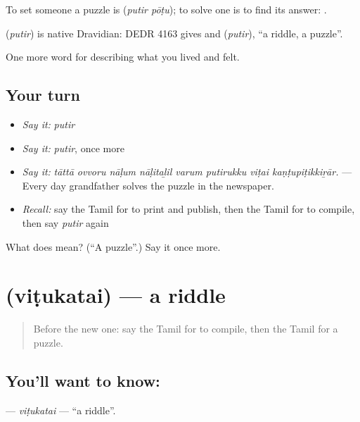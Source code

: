 To set someone a puzzle is   (\emph{putir pōṭu}); to solve one is to find its answer:   .

\begin{cousinweb}
\textbf{} (\emph{putir}) is native Dravidian: DEDR 4163 gives  and  (\emph{putir}), \textquotedblleft{}a riddle, a puzzle\textquotedblright{}.
\end{cousinweb}

\begin{grammarlens}[title={What you've built}]
One more word for describing what you lived and felt.
\end{grammarlens}

\subsection*{Your turn}
\begin{itemize}
\raggedright
  \item \emph{Say it:} \emph{putir}
  \item \emph{Say it:} \emph{putir}, once more
  \item \emph{Say it:} \emph{tāttā ovvoru nāḷum nāḷitaḻil varum putirukku viṭai kaṇṭupiṭikkiṟār.} — Every day grandfather solves the puzzle in the newspaper.
  \item \emph{Recall:} say the Tamil for to print and publish, then the Tamil for to compile, then say \emph{putir} again
\end{itemize}

\begin{tcolorbox}[breakable,colback=teal!4,colframe=teal!35!black,title={Before you move on}]
What does  mean? (\textquotedblleft{}A puzzle\textquotedblright{}.) Say it once more.
\end{tcolorbox}
\section[\texorpdfstring{\ta{விடுகதை} (viṭukatai)}{விடுகதை (viṭukatai)}]{ (viṭukatai) — a riddle}

\label{lesson:TA-C529-vitukatai}



\begin{quote}
Before the new one: say the Tamil for to compile, then the Tamil for a puzzle.
\end{quote}

\subsection*{You'll want to know: }
\textbf{} — \emph{viṭukatai} — \textquotedblleft{}a riddle\textquotedblright{}.

